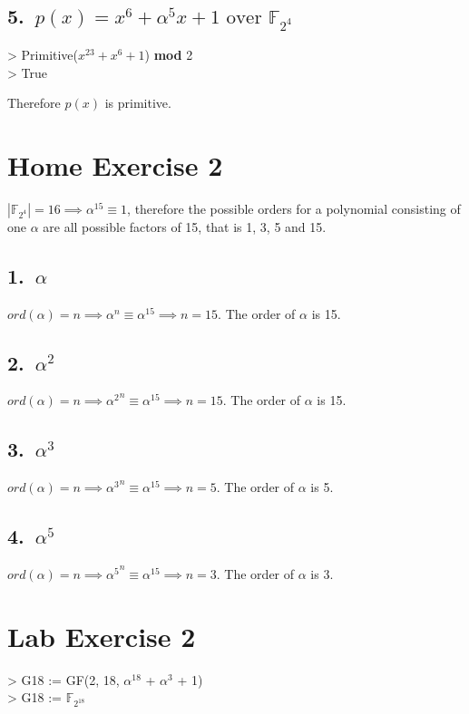 \documentclass[12pt]{article}
\newenvironment{Courier}{\fontfamily{pcr}\selectfont}{\par}
\begin{document}
    \subsection*{5.\ \(p(x) = x^{6} + \alpha^5x + 1 \text{ over } \mathbb{F}_{2^4}\)}

        \begin{Courier}
        \hspace*{10pt} > Primitive(\(x^{23} + x^6 + 1\)) \textbf{mod} 2
        \\
        \hspace*{10pt} > True
        \end{Courier}
        Therefore \(p(x)\) is primitive.

\section*{Home Exercise 2}
\(|\mathbb{F}_{2^4}| = 16 \implies \alpha^{15}  \equiv  1 \), therefore the possible orders for a polynomial consisting of one \(\alpha\) are all possible factors of 15, that is 1, 3, 5 and 15.
\subsection*{1.\ \(\alpha\)}

\(ord(\alpha) = n \implies \alpha^n \equiv \alpha^{15}  \implies n=15\).
The order of \(\alpha\) is 15.
\subsection*{2.\ \(\alpha^2\)}
\(ord(\alpha) = n \implies {\alpha^2}^n \equiv \alpha^{15} \implies n=15\).
The order of \(\alpha\) is 15.
\subsection*{3.\ \(\alpha^3\)}
\(ord(\alpha) = n \implies {\alpha^3}^n \equiv \alpha^{15} \implies n=5\).
The order of \(\alpha\) is 5.
\subsection*{4.\ \(\alpha^5\)}
\(ord(\alpha) = n \implies {\alpha^5}^n \equiv \alpha^{15} \implies n=3\).
The order of \(\alpha\) is 3.
\section*{Lab Exercise 2}

    \begin{Courier}
    \hspace*{10pt} > G18 := GF(2, 18, \(\alpha^{18}\) + \(\alpha^3\) + 1)
    \\
    \hspace*{10pt} > G18 := \(\mathbb{F}_{2^{18}}\)

    \end{Courier}
\end{document}
